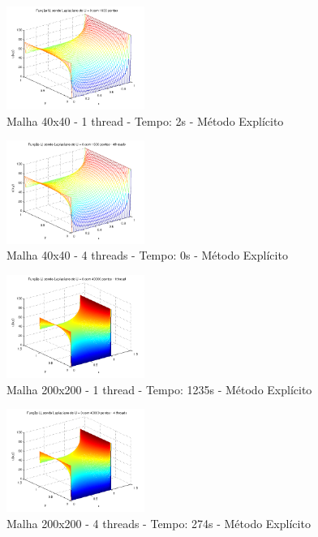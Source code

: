 \documentclass[journal]{IEEEtran}
\begin{document}
\begin{figure}[ht!]
\centering
\includegraphics[width = 0.4\textwidth]{figures/problema01_m1/04.png}
\caption{Malha 40x40 - 1 thread - Tempo: 2s - Método Explícito\label{malha40x40_1th}}
\end{figure}

\begin{figure}[ht!]
\centering
\includegraphics[width = 0.4\textwidth]{figures/problema01_m1/10.png}
\caption{Malha 40x40 - 4 threads - Tempo: 0s - Método Explícito\label{malha40x40_4th}}
\end{figure}

\begin{figure}[ht!]

\centering
\includegraphics[width = 0.4\textwidth]{figures/problema01_m1/13.png}
\caption{Malha 200x200 - 1 thread - Tempo: 1235s - Método Explícito\label{malha200x200_1th}}
\end{figure}

\begin{figure}[ht!]

\centering
\includegraphics[width = 0.4\textwidth]{figures/problema01_m1/14.png}
\caption{Malha 200x200 - 4 threads - Tempo: 274s - Método Explícito\label{malha200x200_4th}}
\end{figure}
\end{document}
